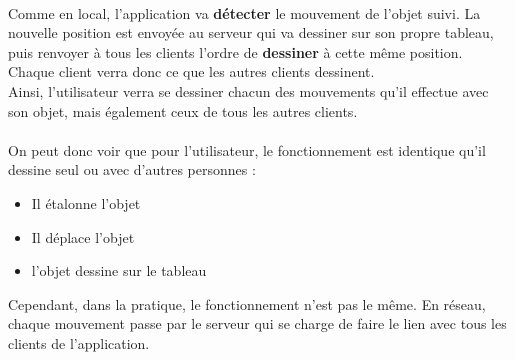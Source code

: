 \documentclass{report}
\begin{document}
				\paragraph{}
				Comme en local, l'application va \textbf{détecter} le mouvement de l'objet suivi. La nouvelle position est envoyée au serveur qui va dessiner sur son propre tableau, puis renvoyer à tous les clients l'ordre de \textbf{dessiner} à cette même position. Chaque client verra donc ce que les autres clients dessinent. \\
				Ainsi, l'utilisateur verra se dessiner chacun des mouvements qu'il effectue avec son objet, mais également ceux de tous les autres clients.
				\paragraph{}
				On peut donc voir que pour l'utilisateur, le fonctionnement est identique qu'il dessine seul ou avec d'autres personnes :
				\begin{itemize}
					\item Il étalonne l'objet
					\item Il déplace l'objet
					\item l'objet dessine sur le tableau
				\end{itemize}
				Cependant, dans la pratique, le fonctionnement n'est pas le même. En réseau, chaque mouvement passe par le serveur qui se charge de faire le lien avec tous les clients de l'application.

			\newpage
\end{document}

